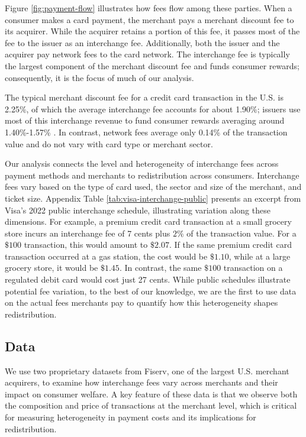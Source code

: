 \documentclass[main.tex]{subfiles}
\begin{document}
Figure \ref{fig:payment-flow} illustrates how fees flow among these parties.
When a consumer makes a card payment, the merchant pays a merchant discount fee to its acquirer.
While the acquirer retains a portion of this fee, it passes most of the fee to the issuer as an interchange fee.
Additionally, both the issuer and the acquirer pay network fees to the card network.
The interchange fee is typically the largest component of the merchant discount fee and funds consumer rewards; consequently, it is the focus of much of our analysis.

The typical merchant discount fee for a credit card transaction in the U.S. is 2.25\%, of which the average interchange fee accounts for about 1.90\%; issuers use most of this interchange revenue to fund consumer rewards averaging around 1.40\%-1.57\% \citep{Nilson2023,Drechsler.etal2025}.
In contrast, network fees average only 0.14\% of the transaction value and do not vary with card type or merchant sector.

Our analysis connects the level and heterogeneity of interchange fees across payment methods and merchants to redistribution across consumers.
Interchange fees vary based on the type of card used, the sector and size of the merchant, and ticket size.
Appendix Table \ref{tab:visa-interchange-public} presents an excerpt from Visa's 2022 public interchange schedule, illustrating variation along these dimensions.
For example, a premium credit card transaction at a small grocery store incurs an interchange fee of 7 cents plus $2\%$ of the transaction value.
For a $\$100$ transaction, this would amount to $\$2.07$.
If the same premium credit card transaction occurred at a gas station, the cost would be $\$1.10$, while at a large grocery store, it would be $\$1.45$.
In contrast, the same $\$100$ transaction on a regulated debit card would cost just 27 cents.
While public schedules illustrate potential fee variation, to the best of our knowledge, we are the first to use data on the actual fees merchants pay to quantify how this heterogeneity shapes redistribution.

\subsection{Data}

We use two proprietary datasets from Fiserv, one of the largest U.S. merchant acquirers, to examine how interchange fees vary across merchants and their impact on consumer welfare.
A key feature of these data is that we observe both the composition and price of transactions at the merchant level, which is critical for measuring heterogeneity in payment costs and its implications for redistribution.
\end{document}
